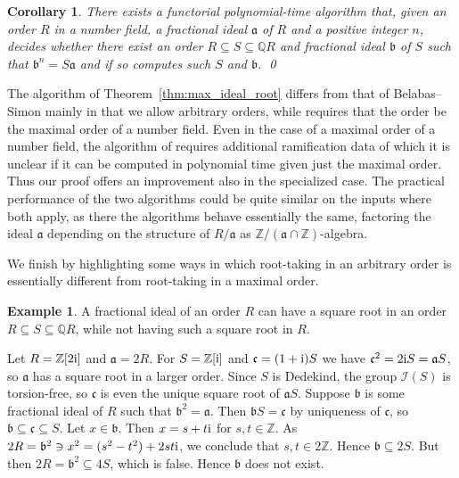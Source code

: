 \documentclass{amsart}
\theoremstyle{plain}
\newtheorem{corollary}[theorem]{Corollary}
\theoremstyle{definition}
\newtheorem{example}[theorem]{Example}
\newcommand{\Z}{\ensuremath{\mathbb{Z}}}
\newcommand{\Q}{\ensuremath{\mathbb{Q}}}
\newcommand{\ii}{\textup{i}}
\begin{document}
\begin{corollary}
There exists a functorial polynomial-time algorithm that, given an order \(R\) in a number field, a fractional ideal \(\mathfrak{a}\) of \(R\) and a positive integer \(n\), decides whether there exist an order \(R\subseteq S\subseteq \Q R\) and fractional ideal \(\mathfrak{b}\) of \(S\) such that \(\mathfrak{b}^n=S\mathfrak{a}\) and if so computes such \(S\) and \(\mathfrak{b}\). \qed 
\end{corollary}

The algorithm of Theorem~\ref{thm:max_ideal_root} differs from that of Belabas--Simon \cite{Belabas} mainly in that we allow arbitrary orders, while \cite{Belabas} requires that the order be the maximal order of a number field.
Even in the case of a maximal order of a number field, the algorithm of \cite{Belabas} requires additional ramification data of which it is unclear if it can be computed in polynomial time given just the maximal order.
Thus our proof offers an improvement also in the specialized case.
The practical performance of the two algorithms could be quite similar on the inputs where both apply, as there the algorithms behave essentially the same, factoring the ideal $\mathfrak{a}$ depending on the structure of $R/\mathfrak{a}$ as $\Z/(\mathfrak{a}\cap\Z)$-algebra.

We finish by highlighting some ways in which root-taking in an arbitrary order is essentially different from root-taking in a maximal order. 

\begin{example}\label{ex:need_extension}
A fractional ideal of an order \(R\) can have a square root in an order \(R\subseteq S\subseteq \Q R\), while not having such a square root in \(R\).

Let \(R=\Z[2\ii]\) and \(\mathfrak{a}=2R\). 
For \(S=\Z[\ii]\) and \(\mathfrak{c}=(1+\ii)S\) we have \(\mathfrak{c}^2=2\ii S= \mathfrak{a}S\), so \(\mathfrak{a}\) has a square root in a larger order.
Since \(S\) is Dedekind, the group \(\mathcal{I}(S)\) is torsion-free, so \(\mathfrak{c}\) is even the unique square root of \(\mathfrak{a}S\).
Suppose \(\mathfrak{b}\) is some fractional ideal of \(R\) such that \(\mathfrak{b}^2=\mathfrak{a}\).
Then \(\mathfrak{b}S=\mathfrak{c}\) by uniqueness of \(\mathfrak{c}\), so \(\mathfrak{b}\subseteq\mathfrak{c}\subseteq S\).
Let \(x\in\mathfrak{b}\). Then \(x=s+t\ii\) for \(s,t\in\Z\).
As \(2R = \mathfrak{b}^2 \ni x^2 = (s^2-t^2)+2st\ii\), we conclude that \(s,t\in2\Z\). Hence \(\mathfrak{b}\subseteq 2 S\). But then \(2R=\mathfrak{b}^2\subseteq 4 S\), which is false.
Hence \(\mathfrak{b}\) does not exist.
\end{example}
\end{document}
